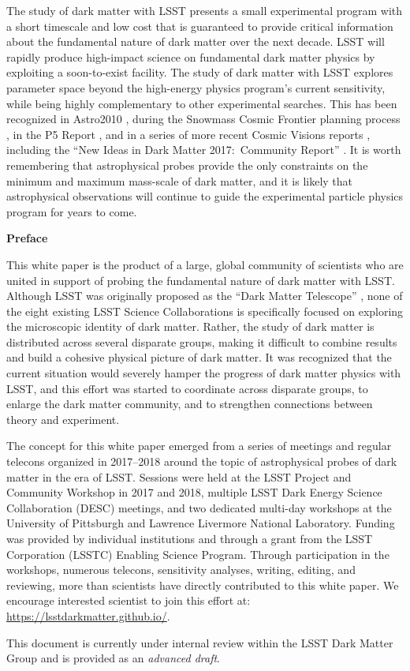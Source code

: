 The study of dark matter with LSST presents a small experimental program with a short timescale and low cost that is guaranteed to provide critical information about the fundamental nature of dark matter over the next decade.
LSST will rapidly produce high-impact science on fundamental dark matter physics by exploiting a soon-to-exist facility. 
The study of dark matter with LSST explores parameter space beyond the high-energy physics program's current sensitivity, while being highly complementary to other experimental searches. %
This has been recognized in Astro2010 \citep{Astro2010}, during the Snowmass Cosmic Frontier planning process \citep[\eg,][]{1305.1605, 1310.8642, 1310.5662}, in the P5 Report \citep[]{P5Report}, and in a series of more recent Cosmic Visions reports \citep[\eg,][]{1604.07626,1802.07216}, including the ``New Ideas in Dark Matter 2017:\ Community Report'' \citep{Battaglieri:2017aum}.
It is worth remembering that astrophysical probes provide the only constraints on the minimum and maximum mass-scale of dark matter, and it is likely that astrophysical observations will continue to guide the experimental particle physics program for years to come.

\clearpage

\begin{center}
  {\Large \bf Preface}
\end{center}

This white paper is the product of a large, global community of scientists who are united in support of probing the fundamental nature of dark matter with LSST.
Although LSST was originally proposed as the ``Dark Matter Telescope'' \citep{Tyson:2001}, none of the eight existing LSST Science Collaborations is specifically focused on exploring the microscopic identity of dark matter.
Rather, the study of dark matter is distributed across several disparate groups, making it difficult to combine results and build a cohesive physical picture of dark matter.
It was recognized that the current situation would severely hamper the progress of dark matter physics with LSST, and this effort was started to coordinate across disparate groups, to enlarge the dark matter community, and to strengthen connections between theory and experiment.

The concept for this white paper emerged from a series of meetings and regular telecons organized in 2017--2018 around the topic of astrophysical probes of dark matter in the era of LSST.
Sessions were held at the LSST Project and Community Workshop in 2017 and 2018, multiple LSST Dark Energy Science Collaboration (DESC) meetings, and two dedicated multi-day workshops at the University of Pittsburgh and Lawrence Livermore National Laboratory.
Funding was provided by individual institutions and through a grant from the LSST Corporation (LSSTC) Enabling Science Program.
Through participation in the workshops, numerous telecons, sensitivity analyses, writing, editing, and reviewing, more than  scientists have directly contributed to this white paper.
We encourage interested scientist to join this effort at: \textcolor{blue}{\url{https://lsstdarkmatter.github.io/}}.

This document is currently under internal review within the LSST Dark Matter Group and is provided as an \emph{advanced draft}.

